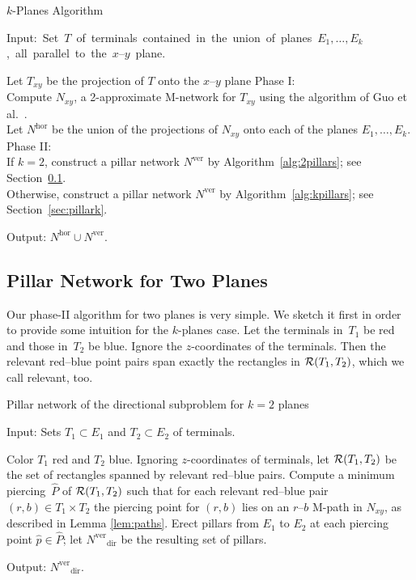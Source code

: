 \documentclass[11pt]{llncs}
\newcommand{\Nhor}{\ensuremath{N^\mathrm{hor}}\xspace}
\newcommand{\Nver}{\ensuremath{N^\mathrm{ver}}\xspace}
\newcommand{\dir}{\ensuremath{\mathrm{dir}}}
\newcommand{\Nxy}{\ensuremath{N_{xy}}\xspace}
\newcommand{\etal}{et al.}
\begin{document}
\begin{algorithm}[htpb]
\caption{$k$-Planes Algorithm}
\label{alg:kplanes}
\mbox{Input: Set $T$ of terminals contained in the union of planes $E_1,
\ldots, E_k$, all parallel to the $x$--$y$ plane.}\\[-2.5ex]
\begin{algorithmic}[1]
\STATE Let $T_{xy}$ be the projection of $T$ onto the $x$--$y$ plane 
\STATE Phase I: 
\\\quad Compute $\Nxy$, a 2-approximate M-network for $T_{xy}$ using the algorithm of
Guo \etal~\cite{gsz-yaa2a-08}.
\\\quad Let $\Nhor$ be the union of the projections of $N_{xy}$ onto each
of the planes $E_1, \ldots, E_k$.
\STATE Phase II:  
\\\quad If $k=2$, construct a pillar network $\Nver$ by
Algorithm~\ref{alg:2pillars}; see Section~\ref{sec:pillar2}.
\\\quad Otherwise, construct a pillar network $\Nver$ by
Algorithm~\ref{alg:kpillars}; see Section~\ref{sec:pillark}.
\end{algorithmic}
Output: $\Nhor \cup \Nver$.
\end{algorithm}


\subsection{Pillar Network for Two Planes}
\label{sec:pillar2}

Our phase-II algorithm for two planes is very simple.  We sketch it
first in order to provide some intuition for the $k$-planes
case.  Let the terminals in~$T_1$ be red and those in~$T_2$  be blue.
Ignore the $z$-coordinates of the terminals.  Then the relevant
red--blue point pairs span exactly the rectangles in ${\cal
  R}(T_1,T_2)$, which we call relevant, too.

\begin{algorithm}[htpb]\caption{Pillar network of the directional subproblem for
$k=2$ planes}
Input: Sets $T_1 \subset E_1$ and $T_2 \subset E_2$ of terminals.
\label{alg:2pillars}
\begin{algorithmic}[1]
\STATE Color $T_1$ red and $T_2$ blue.
\STATE Ignoring $z$-coordinates of terminals, let ${\cal R}(T_1,T_2)$ be
the set of rectangles spanned by relevant red--blue pairs.  
\STATE Compute a minimum piercing~$\hat{P}$ of ${\cal R}(T_1,T_2)$ such that
for each relevant red--blue pair $(r,b) \in T_1 \times T_2$ the piercing point
for $(r,b)$ lies on an $r$--$b$ M-path in $N_{xy}$, as described in Lemma
\ref{lem:paths}.
\STATE Erect pillars from $E_1$ to $E_2$ at each piercing point $\hat{p} \in
\hat{P}$; let $\Nver_\dir$ be the resulting set of pillars. 
\end{algorithmic}
Output: $\Nver_\dir$.
\end{algorithm}
\end{document}
